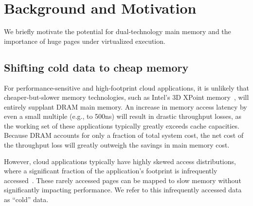 \section{Background and Motivation}
\label{motivation}

We briefly motivate the potential for dual-technology main memory and the importance of huge pages under virtualized execution.

%

\subsection{Shifting cold data to cheap memory}
\label{analytic-model}

For performance-sensitive and high-footprint cloud applications, it is unlikely that cheaper-but-slower
memory technologies, such as Intel's 3D XPoint memory~\cite{3dcrosspoint}, will 
entirely supplant DRAM main memory.
An increase in memory access latency by even a small multiple (e.g., to 500ns)
will result in drastic throughput losses, as the working set of these applications typically
greatly exceeds cache capacities.
Because DRAM accounts for only a fraction of total system cost, the net cost of the
throughput loss will greatly outweigh the savings in main memory cost.

However, cloud applications typically have highly skewed access distributions, where
a significant fraction of the application's footprint is infrequently
accessed~\cite{ycsb}.
These rarely accessed pages can be mapped to slow memory without significantly impacting performance.
We refer to this infrequently accessed data as ``cold'' data.


